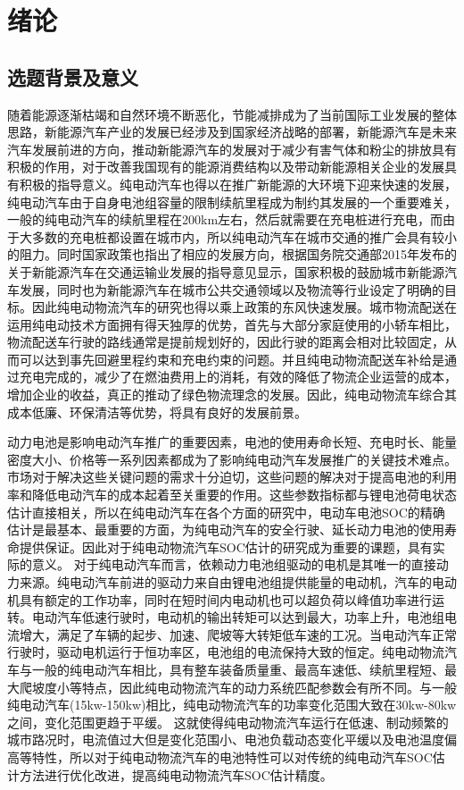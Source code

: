 
\chapter{绪论}
\section{选题背景及意义}
随着能源逐渐枯竭和自然环境不断恶化，节能减排成为了当前国际工业发展的整体思路，新能源汽车产业的发展已经涉及到国家经济战略的部署，新能源汽车是未来汽车发展前进的方向，推动新能源汽车的发展对于减少有害气体和粉尘的排放具有积极的作用，对于改善我国现有的能源消费结构以及带动新能源相关企业的发展具有积极的指导意义。纯电动汽车也得以在推广新能源的大环境下迎来快速的发展，纯电动汽车由于自身电池组容量的限制续航里程成为制约其发展的一个重要难关，一般的纯电动汽车的续航里程在200km左右，然后就需要在充电桩进行充电，而由于大多数的充电桩都设置在城市内，所以纯电动汽车在城市交通的推广会具有较小的阻力。同时国家政策也指出了相应的发展方向，根据国务院交通部2015年发布的关于新能源汽车在交通运输业发展的指导意见显示，国家积极的鼓励城市新能源汽车发展，同时也为新能源汽车在城市公共交通领域以及物流等行业设定了明确的目标。因此纯电动物流汽车的研究也得以乘上政策的东风快速发展。城市物流配送在运用纯电动技术方面拥有得天独厚的优势，首先与大部分家庭使用的小轿车相比，物流配送车行驶的路线通常是提前规划好的，因此行驶的距离会相对比较固定，从而可以达到事先回避里程约束和充电约束的问题。并且纯电动物流配送车补给是通过充电完成的，减少了在燃油费用上的消耗，有效的降低了物流企业运营的成本，增加企业的收益，真正的推动了绿色物流理念的发展。因此，纯电动物流车综合其成本低廉、环保清洁等优势，将具有良好的发展前景。

	动力电池是影响电动汽车推广的重要因素，电池的使用寿命长短、充电时长、能量密度大小、价格等一系列因素都成为了影响纯电动汽车发展推广的关键技术难点。市场对于解决这些关键问题的需求十分迫切，这些问题的解决对于提高电池的利用率和降低电动汽车的成本起着至关重要的作用。这些参数指标都与锂电池荷电状态估计直接相关，所以在纯电动汽车在各个方面的研究中，电动车电池SOC的精确估计是最基本、最重要的方面，为纯电动汽车的安全行驶、延长动力电池的使用寿命提供保证。因此对于纯电动物流汽车SOC估计的研究成为重要的课题，具有实际的意义。
对于纯电动汽车而言，依赖动力电池组驱动的电机是其唯一的直接动力来源。纯电动汽车前进的驱动力来自由锂电池组提供能量的电动机，汽车的电动机具有额定的工作功率，同时在短时间内电动机也可以超负荷以峰值功率进行运转。电动汽车低速行驶时，电动机的输出转矩可以达到最大，功率上升，电池组电流增大，满足了车辆的起步、加速、爬坡等大转矩低车速的工况。当电动汽车正常行驶时，驱动电机运行于恒功率区，电池组的电流保持大致的恒定。纯电动物流汽车与一般的纯电动汽车相比，具有整车装备质量重、最高车速低、续航里程短、最大爬坡度小等特点，因此纯电动物流汽车的动力系统匹配参数会有所不同。与一般纯电动汽车(15kw-150kw)相比，纯电动物流汽车的功率变化范围大致在30kw-80kw之间，变化范围更趋于平缓。 这就使得纯电动物流汽车运行在低速、制动频繁的城市路况时，电流值过大但是变化范围小、电池负载动态变化平缓以及电池温度偏高等特性，所以对于纯电动物流汽车的电池特性可以对传统的纯电动汽车SOC估计方法进行优化改进，提高纯电动物流汽车SOC估计精度。

